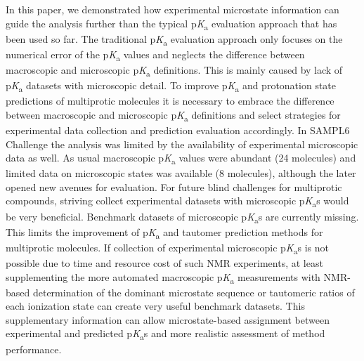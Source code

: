 \documentclass[9pt,lineno,final]{elife}
\newcommand{\pKa}{p\textit{K}\textsubscript{a}}
\begin{document}
In this paper, we demonstrated how experimental microstate information can guide the analysis further than the typical \pKa{} evaluation approach that has been used so far. The traditional \pKa{} evaluation approach only focuses on the numerical error of the \pKa{} values and neglects the difference between macroscopic and microscopic \pKa{} definitions.
This is mainly caused by lack of \pKa{} datasets with microscopic detail. 
To improve \pKa{} and protonation state predictions of multiprotic molecules it is necessary to embrace the difference between  macroscopic and microscopic \pKa{} definitions and select strategies for experimental data collection and prediction evaluation accordingly.
In SAMPL6 Challenge the analysis was limited by the availability of experimental microscopic data as well. As usual macroscopic \pKa{} values were abundant (24 molecules) and limited data on microscopic states was available (8 molecules), although the later opened new avenues for evaluation. 
For future blind challenges for multiprotic compounds, striving collect experimental datasets with microscopic \pKa{}s would be very beneficial. 
Benchmark datasets of microscopic \pKa{}s are currently missing. 
This limits the improvement of \pKa{} and tautomer prediction methods for multiprotic molecules. 
If collection of experimental microscopic \pKa{}s is not possible due to time and resource cost of such NMR experiments, at least supplementing the more automated macroscopic \pKa{} measurements with NMR-based determination of the dominant microstate sequence or tautomeric ratios of each ionization state can create very useful benchmark datasets. This supplementary information can allow microstate-based assignment between experimental and predicted \pKa{}s and more realistic assessment of method performance.
\end{document}
